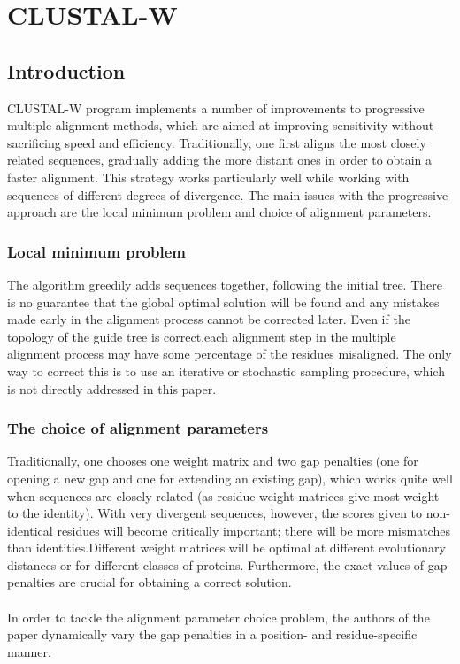 \graphicspath{{chapters/08/images}}
\chapter{CLUSTAL-W}

\section{Introduction}
CLUSTAL-W program implements a number of improvements to progressive multiple alignment methods, which are aimed at improving sensitivity without sacrificing speed and efficiency.
Traditionally, one first aligns the most closely related sequences, gradually adding the more distant ones in order to obtain a faster alignment. This strategy works particularly well while working with sequences of different degrees of divergence.
The main issues with the progressive approach are the local minimum problem and choice of alignment parameters.

\subsection{Local minimum problem}
The algorithm greedily adds sequences together, following the initial tree. There is no guarantee that the global optimal solution will be found and any mistakes made early in the alignment process cannot be corrected later. Even if the topology of the guide tree is correct,each alignment step in the multiple alignment process may have some percentage of the residues misaligned. The only way to correct this is to use an iterative or stochastic sampling procedure, which is not directly addressed in this paper.

\subsection{The choice of alignment parameters}
Traditionally, one chooses one weight matrix and two gap penalties (one for opening a new gap and one for extending an existing gap), which works quite well when sequences are closely related (as residue weight matrices give most weight to the identity).  With very divergent sequences, however, the scores given to non-identical residues will become critically important; there will be more mismatches than identities.Different weight matrices will be optimal at different evolutionary distances or for different classes of proteins. Furthermore, the exact values of gap penalties are crucial for obtaining a correct solution.
\\
\\
\noindent
In order to tackle the alignment parameter choice problem, the authors of the paper dynamically vary the gap penalties in a position- and residue-specific manner.

